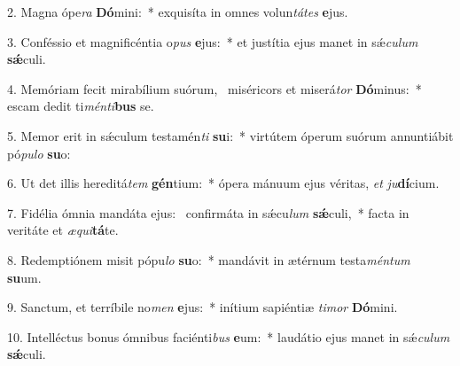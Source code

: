 2. Magna ópe\textit{ra} \textbf{Dó}mini:~*  exquisíta in omnes volun\textit{tá}\textit{tes} \textbf{e}jus.\

3. Conféssio et magnificéntia o\textit{pus} \textbf{e}jus:~*  et justítia ejus manet in sǽ\textit{cu}\textit{lum} \textbf{sǽ}culi.\

4. Memóriam fecit mirabílium suórum, \dag\  miséricors et miserá\textit{tor} \textbf{Dó}minus:~*  escam dedit ti\textit{mén}\textit{ti}\textbf{bus} se.\

5. Memor erit in sǽculum testamén\textit{ti} \textbf{su}i:~*  virtútem óperum suórum annuntiábit pó\textit{pu}\textit{lo} \textbf{su}o:\

6. Ut det illis hereditá\textit{tem} \textbf{gén}tium:~*  ópera mánuum ejus véritas, \textit{et} \textit{ju}\textbf{dí}cium.\

7. Fidélia ómnia mandáta ejus: \dag\  confirmáta in sǽcu\textit{lum} \textbf{sǽ}culi,~*  facta in veritáte et \textit{æ}\textit{qui}\textbf{tá}te.\

8. Redemptiónem misit pópu\textit{lo} \textbf{su}o:~*  mandávit in ætérnum testa\textit{mén}\textit{tum} \textbf{su}um.\

9. Sanctum, et terríbile no\textit{men} \textbf{e}jus:~*  inítium sapiéntiæ \textit{ti}\textit{mor} \textbf{Dó}mini.\

10. Intelléctus bonus ómnibus faciénti\textit{bus} \textbf{e}um:~*  laudátio ejus manet in sǽ\textit{cu}\textit{lum} \textbf{sǽ}culi.\

